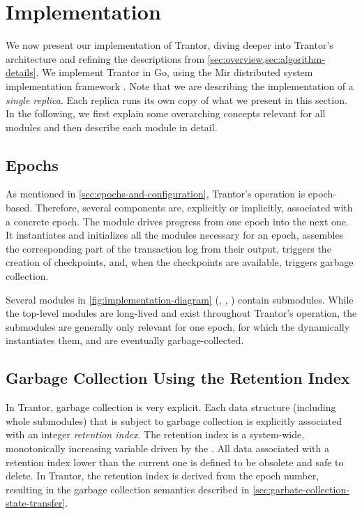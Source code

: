 \documentclass{article}
\begin{document}
\section{Implementation}
\label{sec:implementation}

We now present our implementation of Trantor, diving deeper into Trantor's architecture and refining the descriptions from \cref{sec:overview,sec:algorithm-details}.
We implement Trantor in Go, using the Mir distributed system implementation framework \cite{mir}.
Note that we are describing the implementation of a \emph{single replica}.
Each replica runs its own copy of what we present in this section.
In the following, we first explain some overarching concepts relevant for all modules and then describe each module in detail.

\subsection{Epochs}

As mentioned in \cref{sec:epochs-and-configuration}, Trantor's operation is epoch-based.
Therefore, several components are, explicitly or implicitly, associated with a concrete epoch.
The  module drives progress from one epoch into the next one.
It instantiates and initializes all the modules necessary for an epoch, assembles the corresponding part of the transaction log from their output,
triggers the creation of checkpoints, and, when the checkpoints are available, triggers garbage collection.

Several modules in \cref{fig:implementation-diagram} (, , ) contain submodules.
While the top-level modules are long-lived and exist throughout Trantor's operation,
the submodules are generally only relevant for one epoch, for which the  dynamically instantiates them, and are eventually garbage-collected.

\subsection{Garbage Collection Using the Retention Index}

In Trantor, garbage collection is very explicit.
Each data structure (including whole submodules) that is subject to garbage collection is explicitly associated with an integer \emph{retention index}.
The retention index is a system-wide, monotonically increasing variable driven by the .
All data associated with a retention index lower than the current one is defined to be obsolete and safe to delete.
In Trantor, the retention index is derived from the epoch number,
resulting in the garbage collection semantics described in \cref{sec:garbate-collection-state-transfer}.
\end{document}
